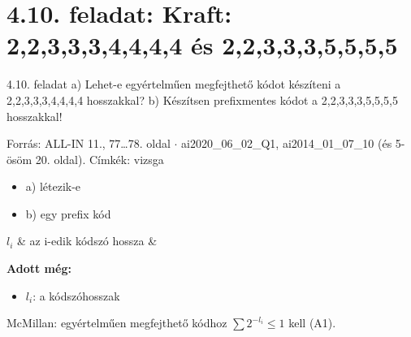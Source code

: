 \begin{center}\end{center}
\begin{eredmeny}

\begin{center}\end{center}
\end{eredmeny}


\section{\texorpdfstring{4.10. feladat: Kraft: 2,2,3,3,3,4,4,4,4 és 2,2,3,3,3,5,5,5,5}{4.10. feladat: Kraft: 2,2,3,3,3,4,4,4,4 és 2,2,3,3,3,5,5,5,5}}\label{ai4_10}
\setcounter{lepes}{0}
\begin{feladat}{4.10. feladat}
a) Lehet-e egyértelműen megfejthető kódot készíteni a 2,2,3,3,3,4,4,4,4 hosszakkal? b) Készítsen prefixmentes kódot a 2,2,3,3,3,5,5,5,5 hosszakkal!

{\footnotesize\sffamily Forrás: ALL-IN 11., 77\ldots{}78. oldal $\cdot$ ai2020\_06\_02\_Q1, ai2014\_01\_07\_10 (és 5-ösöm 20. oldal). Címkék: vizsga}
\end{feladat}
\begin{keresunk}
\begin{itemize}
\item a) létezik-e
\item b) egy prefix kód
\end{itemize}
\end{keresunk}
\begin{jeloles}
\begin{jeltabla}
$l_i$ & az i-edik kódszó hossza & \\
\end{jeltabla}
\par\smallskip\textbf{Adott még:}
\begin{itemize}
\item $l_i$: a kódszóhosszak
\end{itemize}
\end{jeloles}

McMillan: egyértelműen megfejthető kódhoz $\sum2^{-l_i}\le1$ kell (A1).

\begin{center}\end{center}

